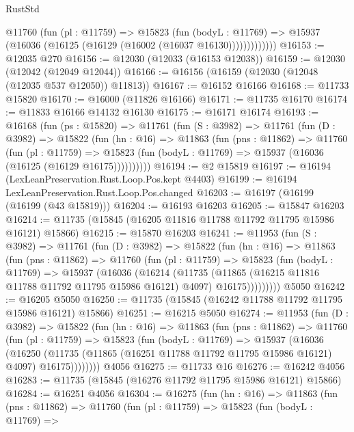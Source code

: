 \begin{lexlean}{RustStd}
\begin{coremodule}
              @11760
                (fun (pl : @11759) =>
                @15823
                  (fun (bodyL : @11769) =>
                  @15937 (@16036 (@16125 (@16129 (@16002 (@16037 @16130)))))))))))))
@16153 := @12035 @270
@16156 := @12030 (@12033 (@16153 @12038))
@16159 := @12030 (@12042 (@12049 @12044))
@16166 := @16156 (@16159 (@12030 (@12048 (@12035 @537 @12050)) @11813))
@16167 := @16152 @16166
@16168 := @11733 @15820
@16170 := @16000 (@11826 @16166)
@16171 := @11735 @16170
@16174 := @11833 @16166 @14132 @16130
@16175 := @16171 @16174
@16193 := @16168
    (fun (ps : @15820) =>
    @11761
      (fun (S : @3982) =>
      @11761
        (fun (D : @3982) =>
        @15822
          (fun (hn : @16) =>
          @11863
            (fun (pns : @11862) =>
            @11760
              (fun (pl : @11759) =>
              @15823 (fun (bodyL : @11769) => @15937 (@16036 (@16125 (@16129 @16175))))))))))
@16194 := @2 @15819
@16197 := @16194 (LexLeanPreservation.Rust.Loop.Pos.kept @4403)
@16199 := @16194 LexLeanPreservation.Rust.Loop.Pos.changed
@16203 := @16197 (@16199 (@16199 (@43 @15819)))
@16204 := @16193 @16203
@16205 := @15847 @16203
@16214 := @11735 (@15845 (@16205 @11816 @11788 @11792 @11795 @15986 @16121) @15866)
@16215 := @15870 @16203
@16241 := @11953
    (fun (S : @3982) =>
    @11761
      (fun (D : @3982) =>
      @15822
        (fun (hn : @16) =>
        @11863
          (fun (pns : @11862) =>
          @11760
            (fun (pl : @11759) =>
            @15823
              (fun (bodyL : @11769) =>
              @15937
                (@16036
                  (@16214
                    (@11735
                      (@11865 (@16215 @11816 @11788 @11792 @11795 @15986 @16121) @4097)
                      @16175)))))))))
    @5050
@16242 := @16205 @5050
@16250 := @11735 (@15845 (@16242 @11788 @11792 @11795 @15986 @16121) @15866)
@16251 := @16215 @5050
@16274 := @11953
    (fun (D : @3982) =>
    @15822
      (fun (hn : @16) =>
      @11863
        (fun (pns : @11862) =>
        @11760
          (fun (pl : @11759) =>
          @15823
            (fun (bodyL : @11769) =>
            @15937
              (@16036
                (@16250
                  (@11735 (@11865 (@16251 @11788 @11792 @11795 @15986 @16121) @4097) @16175))))))))
    @4056
@16275 := @11733 @16
@16276 := @16242 @4056
@16283 := @11735 (@15845 (@16276 @11792 @11795 @15986 @16121) @15866)
@16284 := @16251 @4056
@16304 := @16275
    (fun (hn : @16) =>
    @11863
      (fun (pns : @11862) =>
      @11760
        (fun (pl : @11759) =>
        @15823
          (fun (bodyL : @11769) =>

\end{coremodule}
\end{lexlean}
